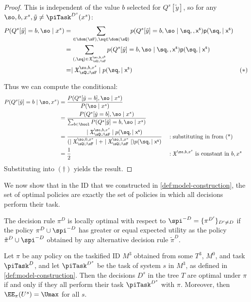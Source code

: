 \begin{proof}
This is independent of the value $b$ selected for $Q^s[\tilde{y}]$, so 
for any $\so,b,x^s, \tilde{y}\neq \piTask^{D^s}(x^s)$:
\begin{align*}
    P(Q^s[\tilde{y}]=b,\so \mid x^s) &= \sum_{\sf \in \dom(\sF),\sq \in \dom (\sQ)} p(Q^s[\tilde{y}]=b,\so\mid \sq,\sf, x^s)p(\sq,\sf \mid x^s) \\
    &= \sum_{(\sf,\sq) \in \mathfrak{X}^{\so,b,x^s}_{\sQ \cup \sF}} p(Q^s[\tilde{y}]=b,\so\mid \sq,\sf, x^s)p(\sq,\sf \mid x^s) \\
    &= \mid \mathfrak{X}^{\so,b,x^s}_{\sQ \cup \sF}\mid p(\sq,\sf \mid x^s) & (*)
\end{align*}

Thus we can compute the conditional:
\begin{align*}
P(Q^s[\tilde{y}]=b \mid \so, x^s)
&= \frac{P(Q^s[\tilde{y}=b],\so \mid x^s)}{P(\so \mid x^s)} & \\
&= \frac{P(Q^s[\tilde{y}=b],\so \mid x^s)}{\sum_{b \in \bool} P(Q^s[\tilde{y}]=b,\so \mid x^s)}& \\
&= \frac{\mid \mathfrak{X}^{\so,b,x^s}_{\sQ \cup \sF}\mid p(\sq,\sf \mid x^s)}{(\mid \mathfrak{X}^{\so,0,x^s}_{\sQ \cup \sF}\mid + \mid \mathfrak{X}^{\so,1,x^s}_{\sQ \cup \sF}\mid ) p(\sq,\sf \mid x^s)}&&:\text{substituting in from (*)}& \\
&= \frac{1}{2} && :\mathfrak{X}^{\so,b,x^s}\text{ is constant in $b,x^s$} %
\end{align*}
Substituting into $(\dagger)$ yields the result.
\end{proof}




We now show that in the ID that we constructed in \autoref{def:model-construction}, the set of optimal policies are exactly the set of policies in which all decisions perform their task.

\begin{definition}  \label{def:21feb6.2-local-optimality}
The decision rule $\pi^D$
is locally optimal with respect to $\spi^{-D}=\{\pi^{D'}\}_{D' \neq D}$
if the policy $\pi^D \cup \spi^{-D}$
has greater or equal expected utility
as the policy $\tilde{\pi}^D \cup \spi^{-D}$ 
obtained by any alternative decision rule $\tilde \pi^D$.
\end{definition}


\begin{lemma} \label{le:1.7-optimal-iff-truthful}
Let $\pi$ be any policy on the taskified ID $M^3$ obtained from some $T^3$, $M^0$, and task $\piTask^{D}$, and let $\piTask^{D^s}$ be the task of system $s$ in $M^3$, as defined in  \autoref{def:model-construction}. Then the decisions $D^s$ in the tree $T$ are optimal under $\pi$ if and only if they all perform their task $\piTask^{D^s}$ with $\pi$.  Moreover, then $\EE_\pi(U^s)=\Umax$ for all $s$.
\end{lemma}

